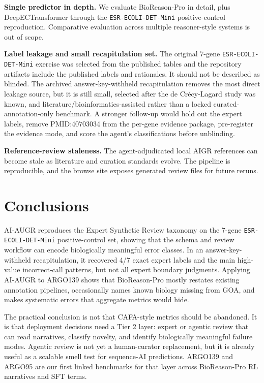 \documentclass[
  11pt,
]{article}
\begin{document}
\textbf{Single predictor in depth.} We evaluate BioReason-Pro in detail,
plus DeepECTransformer through the \texttt{ESR-ECOLI-DET-Mini}
positive-control reproduction. Comparative evaluation across multiple
reasoner-style systems is out of scope.

\textbf{Label leakage and small recapitulation set.} The original 7-gene
\texttt{ESR-ECOLI-DET-Mini} exercise was selected from the published
tables and the repository artifacts include the published labels and
rationales. It should not be described as blinded. The archived
answer-key-withheld recapitulation removes the most direct leakage
source, but it is still small, selected after the de Crécy-Lagard study
was known, and literature/bioinformatics-assisted rather than a locked
curated-annotation-only benchmark. A stronger follow-up would hold out
the expert labels, remove PMID:40703034 from the per-gene evidence
package, pre-register the evidence mode, and score the agent's
classifications before unblinding.

\textbf{Reference-review staleness.} The agent-adjudicated local AIGR
references can become stale as literature and curation standards evolve.
The pipeline is reproducible, and the browse site exposes generated review files for
future reruns.

\hypertarget{conclusions}{%
\section{Conclusions}\label{conclusions}}

AI-AUGR reproduces the Expert Synthetic Review taxonomy on the 7-gene
\texttt{ESR-ECOLI-DET-Mini} positive-control set, showing that the
schema and review workflow can encode biologically meaningful error
classes. In an answer-key-withheld recapitulation, it recovered 4/7
exact expert labels and the main high-value incorrect-call patterns, but
not all expert boundary judgments. Applying AI-AUGR to ARGO139 shows that
BioReason-Pro mostly restates existing annotation pipelines,
occasionally names known biology missing from GOA, and makes systematic
errors that aggregate metrics would hide.

The practical conclusion is not that CAFA-style metrics should be
abandoned. It is that deployment decisions need a Tier 2 layer: expert
or agentic review that can read narratives, classify novelty, and
identify biologically meaningful failure modes. Agentic review is not
yet a human-curator replacement, but it is already useful as a scalable
smell test for sequence-AI predictions. ARGO139 and ARGO95 are our first
linked benchmarks for that layer across BioReason-Pro RL narratives and
SFT terms.
\end{document}
